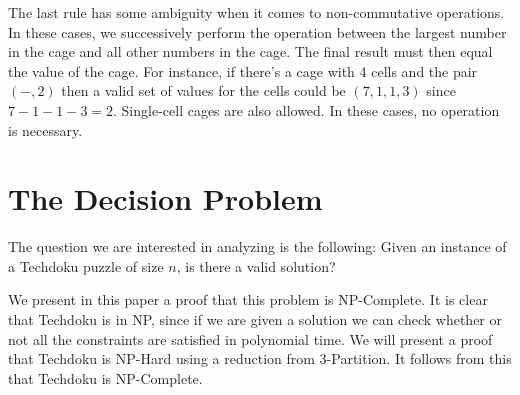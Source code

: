\documentclass[runningheads,a4paper]{llncs}
\begin{document}
The last rule has some ambiguity when it comes to non-commutative operations. In these cases, we successively perform the operation between the largest number in the cage and all other numbers in the cage. The final result must then equal the value of the cage. For instance, if there's a cage with 4 cells and the pair $(-, 2)$ then a valid set of values for the cells could be $(7, 1, 1, 3)$ since $7 - 1 - 1 - 3 = 2$. Single-cell cages are also allowed. In these cases, no operation is necessary. 

\section{The Decision Problem}

The question we are interested in analyzing is the following: Given an instance of a Techdoku puzzle of size $n$, is there a valid solution? 

We present in this paper a proof that this problem is NP-Complete. It is clear that Techdoku is in NP, since if we are given a solution we can check whether or not all the constraints are satisfied in polynomial time. We will present a proof that Techdoku is NP-Hard using a reduction from 3-Partition. It follows from this that Techdoku is NP-Complete. 



\end{document}
